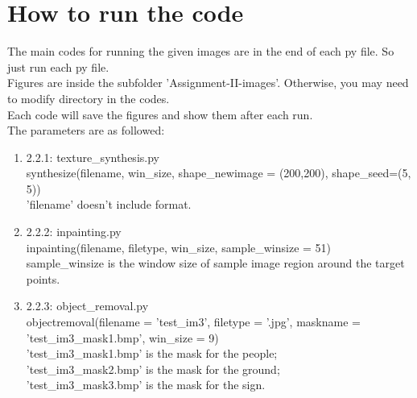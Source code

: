 \documentclass{extarticle}
\theoremstyle{definition}
\theoremstyle{definition}
\begin{document}
\pagebreak

\section{How to run the code}
The main codes for running the given images are in the end of each py file. So just run each py file.\\
Figures are inside the subfolder 'Assignment-II-images'. Otherwise, you may need to modify directory in the codes.\\
Each code will save the figures and show them after each run.\\
The parameters are as followed:
\begin{enumerate}
	\item 2.2.1: texture\_synthesis.py	\\
		synthesize(filename, win\_size, shape\_newimage = (200,200), shape\_seed=(5, 5))\\
		'filename' doesn't include format.
	\item 2.2.2: inpainting.py\\
	inpainting(filename, filetype, win\_size, sample\_winsize = 51)\\
	sample\_winsize is the window size of sample image region around the target points.
	\item 2.2.3: object\_removal.py\\
	objectremoval(filename = 'test\_im3', filetype = '.jpg', maskname = 'test\_im3\_mask1.bmp', win\_size = 9)\\
	'test\_im3\_mask1.bmp' is the mask for the people;\\
	'test\_im3\_mask2.bmp' is the mask for the ground;\\
	'test\_im3\_mask3.bmp' is the mask for the sign.
\end{enumerate}
\end{document}
